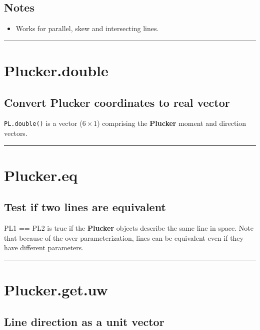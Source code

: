 \subsection*{Notes}
\begin{itemize}
  \item Works for parallel, skew and intersecting lines.
\end{itemize}
\vspace{1.5ex}\hrule

\hypertarget{Plucker.double}{\section*{Plucker.double}}
\subsection*{Convert Plucker coordinates to real vector}


\texttt{PL.double()} is a vector ($6 \times 1$) comprising the \textbf{\color{red} Plucker} moment and direction vectors.

\vspace{1.5ex}\hrule

\hypertarget{Plucker.eq}{\section*{Plucker.eq}}
\subsection*{Test if two lines are equivalent}


PL1 == PL2 is true if the \textbf{\color{red} Plucker} objects describe the same line in
space.  Note that because of the over parameterization, lines can be
equivalent even if they have different parameters.

\vspace{1.5ex}\hrule

\hypertarget{Plucker.get.uw}{\section*{Plucker.get.uw}}
\subsection*{Line direction as a unit vector}


